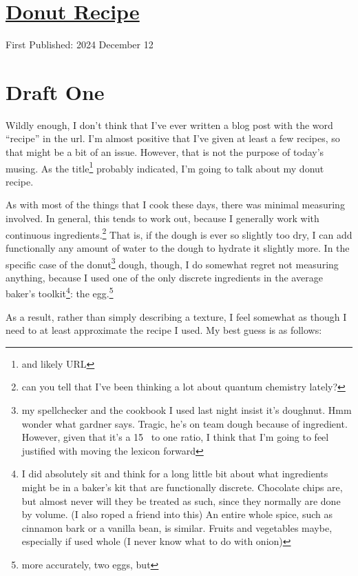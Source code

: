\documentclass[12pt]{article}[titlepage]
\newcommand{\say}[1]{``#1''}
\renewcommand{\,}{\textsuperscript{,}}
\begin{document}
\doublespacing
\section{\href{donut-recipe.html}{Donut Recipe}}
First Published: 2024 December 12
\section{Draft One}

Wildly enough, I don't think that I've ever written a blog post with the word \say{recipe} in the url.  
I'm almost positive that I've given at least a few recipes, so that might be a bit of an issue.  
However, that is not the purpose of today's musing.  
As the title\footnote{and likely URL} probably indicated, I'm going to talk about my donut recipe.

As with most of the things that I cook these days, there was minimal measuring involved.  
In general, this tends to work out, because I generally work with continuous ingredients.\footnote{can you tell that I've been thinking a lot about quantum chemistry lately?}  
That is, if the dough is ever so slightly too dry, I can add functionally any amount of water to the dough to hydrate it slightly more.  
In the specific case of the donut\footnote{my spellchecker and the cookbook I used last night insist it's doughnut. Hmm wonder what gardner says. Tragic, he's on team dough because of ingredient. However, given that it's a 1\.5  to one ratio, I think that I'm going to feel justified with moving the lexicon forward} dough, though, I do somewhat regret not measuring anything, because I used one of the only discrete ingredients in the average baker's toolkit\footnote{I did absolutely sit and think for a long little bit about what ingredients might be in a baker's kit that are functionally discrete. Chocolate chips are, but almost never will they be treated as such, since they normally are done by volume. (I also roped a friend into this) An entire whole spice, such as cinnamon bark or a vanilla bean, is similar. Fruits and vegetables maybe, especially if used whole (I never know what to do with onion)}: the egg.\footnote{more accurately, two eggs, but}

As a result, rather than simply describing a texture, I feel somewhat as though I need to at least approximate the recipe I used.  
My best guess is as follows:
\end{document}
